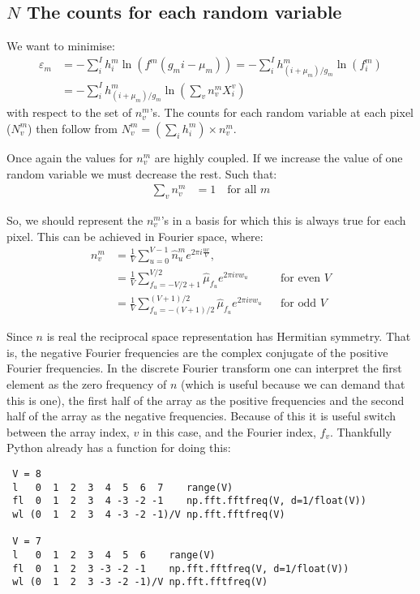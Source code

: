 \documentclass[11pt]{article}
\begin{document}
 
 
 
 
 
\subsection{$N$ The counts for each random variable}
We want to minimise:
\begin{align}
   \varepsilon_m &= -\sum_i^I h^m_i \ln(f^m(g_mi - \mu_m)) = -\sum_i^I h^m_{(i+\mu_m)/g_m} \ln(f^m_i) \\
   &= - \sum_i^I h^m_{(i+\mu_m)/g_m} \ln\left(\sum_v n^m_v X^v_i\right)
\end{align}
with respect to the set of $n^m_v$'s. The counts for each random variable at each pixel ($N^m_v$) then follow from $N^m_v = (\sum_i h^m_i) \times n^m_v$.

Once again the values for $n^m_v$ are highly coupled. If we increase the value of one random variable we must decrease the rest. Such that:
\begin{align}
   \sum_v n^m_v &= 1  \quad \text{for all } m 
\end{align}

So, we should represent the $n^m_v$'s in a basis for which this is always true for each pixel. This can be achieved in Fourier space, where:
\begin{align} 
   n^m_v &= \frac{1}{V} \sum_{u=0}^{V-1} \hat{n}^m_u e^{2\pi i \frac{u v}{V}}, &&\\
   &= \frac{1}{V} \sum_{f_u=-V/2+1}^{V/2} \hat{\mu}_{f_u} e^{2\pi i v w_u}       &&\text{for even } V \\
   &= \frac{1}{V} \sum_{f_u=-(V+1)/2}^{(V+1)/2} \hat{\mu}_{f_u} e^{2\pi i v w_u} &&\text{for odd } V
\end{align}

Since $n$ is real the reciprocal space representation has Hermitian symmetry. That is, the negative Fourier frequencies are the complex conjugate of the positive Fourier frequencies. In the discrete Fourier transform one can interpret the first element as the zero frequency of $n$ (which is useful because we can demand that this is one), the first half of the array as the positive frequencies and the second half of the array as the negative frequencies. Because of this it is useful switch between the array index, $v$ in this case, and the Fourier index, $f_v$. Thankfully Python already has a function for doing this:

\begin{verbatim}
 V = 8
 l   0  1  2  3  4  5  6  7    range(V)
 fl  0  1  2  3  4 -3 -2 -1    np.fft.fftfreq(V, d=1/float(V))
 wl (0  1  2  3  4 -3 -2 -1)/V np.fft.fftfreq(V)
 
 V = 7
 l   0  1  2  3  4  5  6    range(V)
 fl  0  1  2  3 -3 -2 -1    np.fft.fftfreq(V, d=1/float(V))
 wl (0  1  2  3 -3 -2 -1)/V np.fft.fftfreq(V)
\end{verbatim}
\end{document}

